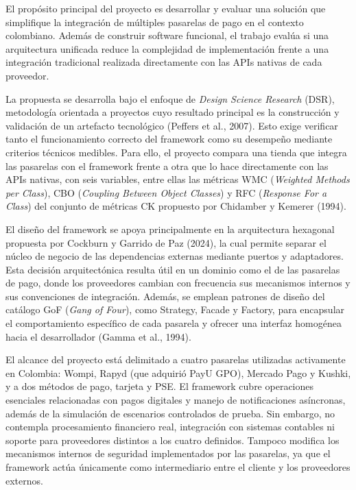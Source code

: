 El propósito principal del proyecto es desarrollar y evaluar una solución que simplifique la integración de múltiples pasarelas de pago en el contexto colombiano. Además de construir software funcional, el trabajo evalúa si una arquitectura unificada reduce la complejidad de implementación frente a una integración tradicional realizada directamente con las APIs nativas de cada proveedor.

La propuesta se desarrolla bajo el enfoque de \textit{Design Science Research} (DSR), metodología orientada a proyectos cuyo resultado principal es la construcción y validación de un artefacto tecnológico (Peffers et al., 2007). Esto exige verificar tanto el funcionamiento correcto del framework como su desempeño mediante criterios técnicos medibles. Para ello, el proyecto compara una tienda que integra las pasarelas con el framework frente a otra que lo hace directamente con las APIs nativas, con seis variables, entre ellas las métricas WMC (\textit{Weighted Methods per Class}), CBO (\textit{Coupling Between Object Classes}) y RFC (\textit{Response For a Class}) del conjunto de métricas CK propuesto por Chidamber y Kemerer (1994).

El diseño del framework se apoya principalmente en la arquitectura hexagonal propuesta por Cockburn y Garrido de Paz (2024), la cual permite separar el núcleo de negocio de las dependencias externas mediante puertos y adaptadores. Esta decisión arquitectónica resulta útil en un dominio como el de las pasarelas de pago, donde los proveedores cambian con frecuencia sus mecanismos internos y sus convenciones de integración. Además, se emplean patrones de diseño del catálogo GoF (\textit{Gang of Four}), como Strategy, Facade y Factory, para encapsular el comportamiento específico de cada pasarela y ofrecer una interfaz homogénea hacia el desarrollador (Gamma et al., 1994).

El alcance del proyecto está delimitado a cuatro pasarelas utilizadas activamente en Colombia: Wompi, Rapyd (que adquirió PayU GPO), Mercado Pago y Kushki, y a dos métodos de pago, tarjeta y PSE. El framework cubre operaciones esenciales relacionadas con pagos digitales y manejo de notificaciones asíncronas, además de la simulación de escenarios controlados de prueba. Sin embargo, no contempla procesamiento financiero real, integración con sistemas contables ni soporte para proveedores distintos a los cuatro definidos. Tampoco modifica los mecanismos internos de seguridad implementados por las pasarelas, ya que el framework actúa únicamente como intermediario entre el cliente y los proveedores externos.


